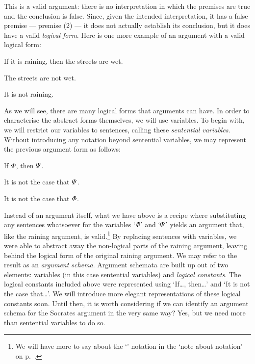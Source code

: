 This is a valid argument: there is no interpretation in which the premises are true and the conclusion is false.
Since, given the intended interpretation, it has a false premise --- premise (2) --- it does not actually establish its conclusion, but it does have a valid \emph{logical form}.
Here is one more example of an argument with a valid logical form:

\begin{earg}
  \item If it is raining, then the streets are wet.
  \item The streets are not wet.
  \item[\therefore] It is not raining.
\end{earg}

As we will see, there are many logical forms that arguments can have.
In order to characterise the abstract forms themselves, we will use variables.
To begin with, we will restrict our variables to sentences, calling these \textit{sentential variables}.
Without introducing any notation beyond sentential variables, we may represent the previous argument form as follows:

\begin{earg}
  \item If $\varPhi{}$, then $\varPsi{}$.
  \item It is not the case that $\varPsi{}$.
  \item[\therefore] It is not the case that $\varPhi{}$.
\end{earg}

Instead of an argument itself, what we have above is a recipe where substituting any sentences whatsoever for the variables `$\varPhi{}$' and `$\varPsi{}$' yields an argument that, like the raining argument, is valid.\footnote{We will have more to say about the `\metaA{}' notation in the `note about notation' on p.\ \pageref{notationnote}.}
By replacing sentences with variables, we were able to abstract away the non-logical parts of the raining argument, leaving behind the logical form of the original raining argument.
We may refer to the result as an \textit{argument schema}.
Argument schemata are built up out of two elements: variables (in this case sentential variables) and \textit{logical constants}.
The logical constants included above were represented using `If\ldots, then\ldots' and `It is not the case that\ldots'.
We will introduce more elegant representations of these logical constants soon.
Until then, it is worth considering if we can identify an argument schema for the Socrates argument in the very same way?
Yes, but we need more than sentential variables to do so.

